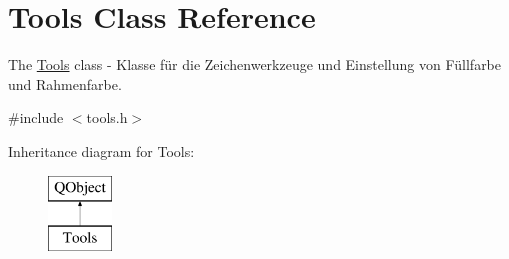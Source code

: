\hypertarget{class_tools}{}\section{Tools Class Reference}
\label{class_tools}


The \hyperlink{class_tools}{Tools} class -\/ Klasse für die Zeichenwerkzeuge und Einstellung von Füllfarbe und Rahmenfarbe.  




{\ttfamily \#include $<$tools.\+h$>$}

Inheritance diagram for Tools\+:\begin{figure}[H]
\begin{center}
\leavevmode
\includegraphics[height=2.000000cm]{class_tools}
\end{center}
\end{figure}

